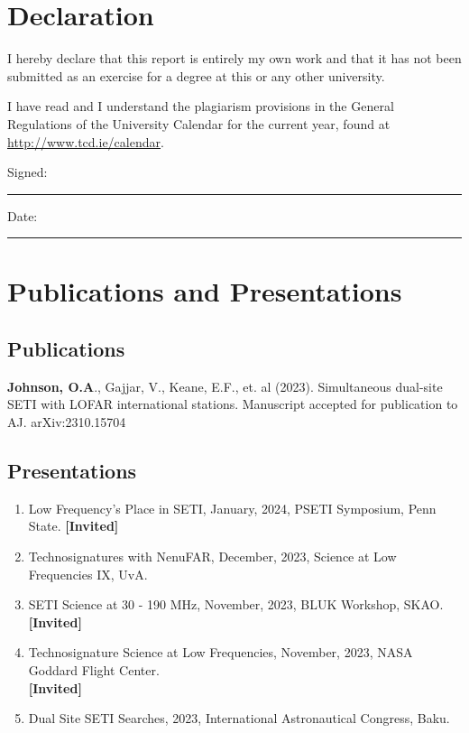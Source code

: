 \documentclass[a4paper,12pt]{article}
\begin{document}
\section*{Declaration}
I hereby declare that this report is entirely my own work and that it has not been submitted as an exercise for a degree at this or any other university.

I have read and I understand the plagiarism provisions in the General Regulations of the University Calendar for the current year, found at \url{http://www.tcd.ie/calendar}.

\vspace{1cm}

Signed:~\rule{5cm}{0.3pt}\hfill Date:~\rule{5cm}{0.3pt}

\vspace*{\fill}
\newpage

\section*{Publications and Presentations}
\subsection*{Publications}

\textbf{Johnson, O.A}., Gajjar, V., Keane, E.F., et. al (2023). Simultaneous dual-site SETI with LOFAR international stations. Manuscript accepted for publication to AJ. arXiv:2310.15704

\subsection*{Presentations}
\begin{enumerate}
\item Low Frequency's Place in SETI, January, 2024, PSETI Symposium, Penn State. \hfill \textbf{[Invited]}
\item Technosignatures with NenuFAR, December, 2023, Science at Low Frequencies IX, UvA. 
\item SETI Science at 30 - 190 MHz, November, 2023, BLUK Workshop, SKAO.\\ \textbf{[Invited]}
\item Technosignature Science at Low Frequencies, November, 2023, NASA Goddard Flight Center. \hfill \\ \textbf{[Invited]}
\item Dual Site SETI Searches, 2023, International Astronautical Congress, Baku. 
\end{enumerate}
\end{document}
